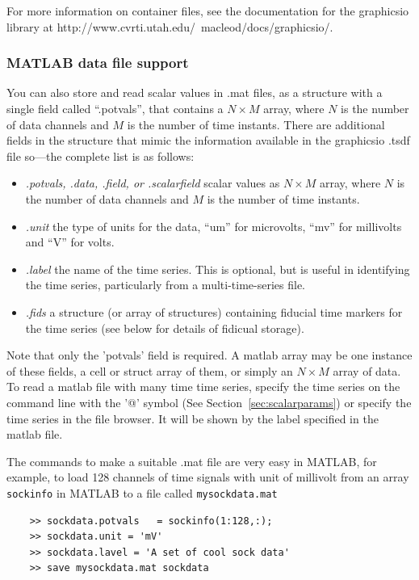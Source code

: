 For more information on container files, see the documentation for the
graphicsio library at
{http://www.cvrti.utah.edu/~macleod/docs/graphicsio/}. 

\subsubsection{MATLAB data file support}
\label{sec:matlabdata}

You can also store and read scalar values in .mat files, as a structure
with a single field called ``.potvals'', that contains a $N \times M$ array,
where $N$ is the number of data channels and $M$ is the number of time
instants.  There are additional fields in the structure that mimic the
information available in the graphicsio .tsdf file so---the complete list is
as follows:
%
\begin{itemize}
  \item \emph{.potvals, .data, .field, or .scalarfield} scalar values as $N
    \times M$ array, where $N$ is the number of data channels and $M$ is
    the number of time instants.
  \item \emph{.unit} the type of units for the data, ``um'' for microvolts,
  ``mv'' for millivolts and ``V'' for volts.
  \item \emph{.label} the name of the time series.  This is optional, but is
    useful in identifying the time series, particularly from a 
    multi-time-series file.
  \item \emph{.fids} a structure (or array of structures) containing
    fiducial time markers for the time series (see below for details of
    fidicual storage).
\end{itemize}

Note that only the 'potvals' field is required.  A matlab array may 
be one instance of these fields, a cell or struct array of them, or 
simply an $N \times M$ array of data.  To read a matlab file with many time
time series, specify the time series on the command line with the '@' symbol
(See Section~\ref{sec:scalarparams}) or specify the time series in the 
file browser.  It will be shown by the label specified in the matlab file.

The commands to make a suitable .mat file are very easy in MATLAB, for
example, to load 128 channels of time signals with unit of millivolt from
an array \texttt{sockinfo} in MATLAB to a file called
\texttt{mysockdata.mat}
%
\begin{verbatim}
    >> sockdata.potvals   = sockinfo(1:128,:);
    >> sockdata.unit = 'mV'
    >> sockdata.lavel = 'A set of cool sock data'
    >> save mysockdata.mat sockdata
\end{verbatim}

